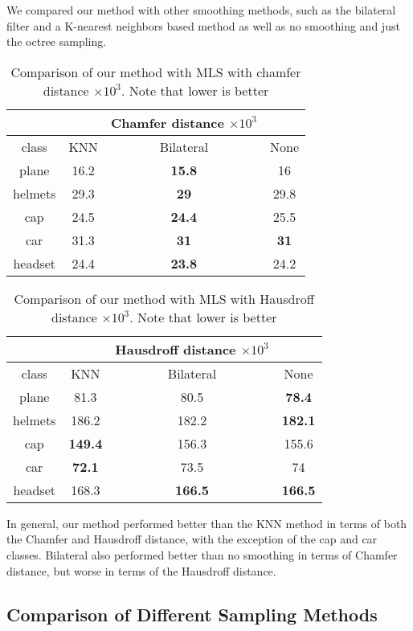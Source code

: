 We compared our method with other smoothing methods, such as the bilateral filter and a K-nearest neighbors based method as well as no smoothing and just the octree sampling.

\begin{table}[H]
\centering
\begin{tabular}{cccc}
	&  & Chamfer distance $\times 10^3$ &\\
	\hline
	class & KNN & Bilateral & None\\
	\hline
	plane & {16.2} & \textbf{15.8} & {16} \\ 
	helmets & {29.3} & \textbf{29} & {29.8} \\
	cap & {24.5} & \textbf{24.4} & {25.5}\\  
	car & {31.3} & \textbf{31} & \textbf{31}\\  
	headset & {24.4} & \textbf{23.8} & {24.2} \\
\end{tabular}
\caption{Comparison of our method with MLS with chamfer distance $\times 10^3$. Note that lower is better}
\end{table}

\begin{table}[H]
\centering
\begin{tabular}{cccc}
	&  & Hausdroff distance $\times 10^3$ &\\
	\hline
	class & KNN & Bilateral & None\\
	\hline
	plane & 81.3 & {80.5} & \textbf{78.4} \\ 
	helmets & 186.2 &  {182.2} & \textbf{182.1}\\
	cap & \textbf{149.4} & {156.3} & {155.6}\\ 
	car & \textbf{72.1} & {73.5} & {74}\\  
	headset & 168.3 & \textbf{166.5} & \textbf{166.5}\\
\end{tabular}
\caption{Comparison of our method with MLS with Hausdroff distance $\times 10^3$. Note that lower is better}
\end{table}

In general, our method performed better than the KNN method in terms of both the Chamfer and Hausdroff distance, with the exception of the cap and car classes. 
Bilateral also performed better than no smoothing in terms of Chamfer distance, but worse in terms of the Hausdroff distance.

\subsection{Comparison of Different Sampling Methods}

